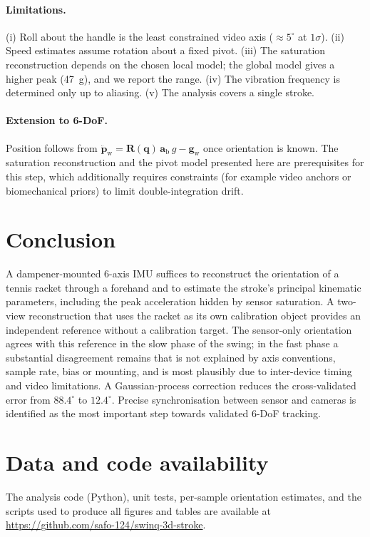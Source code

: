 \documentclass[11pt,a4paper]{article}
\newcommand{\q}{\bm{q}}
\newcommand{\Rm}{\mathbf{R}}
\newcommand{\ve}[1]{\bm{#1}}
\newcommand{\dg}{^{\circ}}
\begin{document}
\paragraph{Limitations.} (i) Roll about the handle is the least constrained video axis
($\approx5\dg$ at $1\sigma$). (ii) Speed estimates assume rotation about a fixed pivot. (iii) The
saturation reconstruction depends on the chosen local model; the global model gives a higher peak
(\SI{47}{g}), and we report the range. (iv) The vibration frequency is determined only up to
aliasing. (v) The analysis covers a single stroke.

\paragraph{Extension to 6-DoF.} Position follows from
$\ddot{\ve p}_{\mathrm w}=\Rm(\q)\,\ve a_{\mathrm b}\,g-\ve g_{\mathrm w}$ once orientation is known.
The saturation reconstruction and the pivot model presented here are prerequisites for this step,
which additionally requires constraints (for example video anchors or biomechanical priors) to limit
double-integration drift.

\section{Conclusion}
A dampener-mounted 6-axis IMU suffices to reconstruct the orientation of a tennis racket through a
forehand and to estimate the stroke's principal kinematic parameters, including the peak
acceleration hidden by sensor saturation. A two-view reconstruction that uses the racket as its own
calibration object provides an independent reference without a calibration target. The sensor-only
orientation agrees with this reference in the slow phase of the swing; in the fast phase a
substantial disagreement remains that is not explained by axis conventions, sample rate, bias or
mounting, and is most plausibly due to inter-device timing and video limitations. A Gaussian-process
correction reduces the cross-validated error from $88.4\dg$ to $12.4\dg$. Precise synchronisation
between sensor and cameras is identified as the most important step towards validated 6-DoF
tracking.

\section*{Data and code availability}
The analysis code (Python), unit tests, per-sample orientation estimates, and the scripts used to
produce all figures and tables are available at
\url{https://github.com/safo-124/swinq-3d-stroke}.
\end{document}
